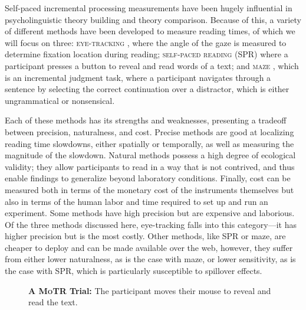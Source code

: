 \documentclass[12pt]{article}
\newcommand{\motr}{\textsc{MoTR}\xspace}
\newcommand{\defn}[1]{\textsc{#1}}
\begin{document}
Self-paced incremental processing measurements have been hugely influential in psycholinguistic theory building and theory comparison. Because of this, a variety of different methods have been developed to measure reading times, of which we will focus on three: \defn{eye-tracking} \citep{yarbus1967eye, rayner1998eye}, where the angle of the gaze is measured to determine fixation location during reading; \defn{self-paced reading (SPR)} \citep{just1982paradigms} where a participant presses a button to reveal and read words of a text; and \defn{maze} \citep{forster2009maze, boyce2020amaze}, which is an incremental judgment task, where a participant navigates through a sentence by selecting the correct continuation over a distractor, which is either ungrammatical or nonsensical.

Each of these methods has its strengths and weaknesses, presenting a tradeoff between precision, naturalness, and cost. Precise methods are good at localizing reading time slowdowns, either spatially or temporally, as well as measuring the magnitude of the slowdown. Natural methods possess a high degree of ecological validity; they allow participants to read in a way that is not contrived, and thus enable findings to generalize beyond laboratory conditions. Finally, cost can be measured both in terms of the monetary cost of the instruments themselves but also in terms of the human labor and time required to set up and run an experiment. Some methods have high precision but are expensive and laborious. Of the three methods discussed here, eye-tracking falls into this category---it has higher precision but is the most costly.
Other methods, like SPR or maze, are cheaper to deploy and can be made available over the web, however, they suffer from either lower naturalness, as is the case with maze, or lower sensitivity, as is the case with SPR, which is particularly susceptible to spillover effects.

\begin{figure*}[t]
    \centering
    \begin{minipage}{0.7\textwidth}
    \centering
    \small
    \vspace{-0.3cm}
    \caption{ \small \textbf{A \motr Trial:} The participant moves their mouse to reveal and read the text.}
    \label{fig:motr-trial}
    \end{minipage}
\end{figure*}
\end{document}
